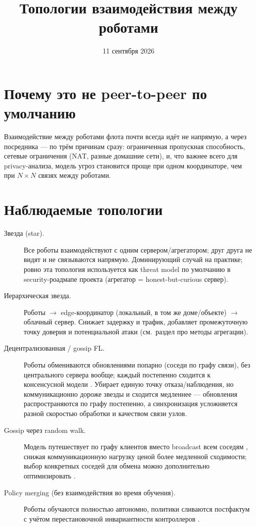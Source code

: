 \documentclass[11pt]{article}
\title{Топологии взаимодействия между роботами}
\author{}
\date{11 сентября 2026}
\begin{document}
\maketitle

\section{Почему это не peer-to-peer по умолчанию}

Взаимодействие между роботами флота почти всегда идёт не напрямую, а через
посредника — по трём причинам сразу: ограниченная пропускная способность,
сетевые ограничения (NAT, разные домашние сети), и, что важнее всего для
privacy-анализа, модель угроз становится проще при одном координаторе, чем при
$N \times N$ связях между роботами.

\section{Наблюдаемые топологии}

\begin{description}
  \item[Звезда (star).] Все роботы взаимодействуют с одним сервером/агрегатором;
        друг друга не видят и не связываются напрямую. Доминирующий случай на
        практике; ровно эта топология используется как threat model по умолчанию
        в security-роадмапе проекта (агрегатор = honest-but-curious сервер).
  \item[Иерархическая звезда.] Роботы $\to$ edge-координатор (локальный, в том же
        доме/объекте) $\to$ облачный сервер. Снижает задержку и трафик, добавляет
        промежуточную точку доверия и потенциальной атаки (см.\ раздел про методы
        агрегации).
  \item[Децентрализованная / gossip FL.] Роботы обмениваются обновлениями попарно
        (соседи по графу связи), без центрального сервера вообще; каждый постепенно
        сходится к консенсусной модели \cite{topologysurvey2023,decentralizedsurvey2023}.
        Убирает единую точку отказа/наблюдения, но коммуникационно дороже звезды и
        сходится медленнее — обновления распространяются по графу постепенно, а
        синхронизация усложняется разной скоростью обработки и качеством связи узлов.
  \item[Gossip через random walk.] Модель \guillemotleft путешествует\guillemotright{}
        по графу клиентов вместо broadcast всем соседям \cite{randomwalk2026},
        снижая коммуникационную нагрузку ценой более медленной сходимости; выбор
        конкретных соседей для обмена можно дополнительно оптимизировать
        \cite{graphgossip2026}.
  \item[Policy merging (без взаимодействия во время обучения).] Роботы обучаются
        полностью автономно, политики сливаются постфактум с учётом перестановочной
        инвариантности контроллеров \cite{fleetmerge2023}.
\end{description}
\end{document}
